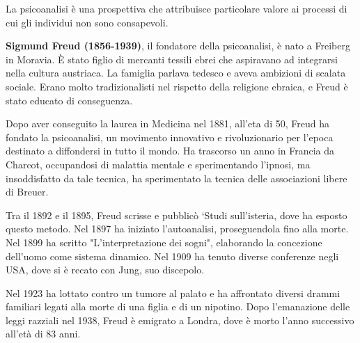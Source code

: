\documentclass{subfiles}
\begin{document}
La psicoanalisi è una prospettiva che attribuisce particolare valore ai processi di cui gli 
individui non sono consapevoli.

\textbf{Sigmund Freud (1856-1939)}, il fondatore della psicoanalisi, è nato a Freiberg in Moravia.
È stato figlio di mercanti tessili ebrei che aspiravano ad integrarsi nella cultura austriaca. 
La famiglia parlava tedesco e aveva ambizioni di scalata sociale. 
Erano molto tradizionalisti nel rispetto della religione ebraica, e Freud è stato educato di conseguenza.

Dopo aver conseguito la laurea in Medicina nel 1881, all'eta di 50, Freud ha fondato la 
psicoanalisi, un movimento innovativo e rivoluzionario per l'epoca destinato a diffondersi in 
tutto il mondo. Ha trascorso un anno in Francia da Charcot, occupandosi di malattia mentale e 
sperimentando l'ipnosi, ma insoddisfatto da tale tecnica, ha sperimentato la tecnica delle 
associazioni libere di Breuer.

Tra il 1892 e il 1895, Freud scrisse e pubblicò `Studi sull'isteria, dove ha esposto questo metodo. Nel 1897 ha iniziato l'autoanalisi, proseguendola fino alla morte. Nel 1899 ha scritto "L'interpretazione dei sogni", elaborando la concezione dell'uomo come sistema dinamico. Nel 1909 ha tenuto diverse conferenze negli USA, dove si è recato con Jung, suo discepolo.

Nel 1923 ha lottato contro un tumore al palato e ha affrontato diversi drammi familiari legati 
alla morte di una figlia e di un nipotino. 
Dopo l'emanazione delle leggi razziali nel 1938, Freud è emigrato a Londra, dove è morto 
l'anno successivo all'età di 83 anni.
\end{document}
